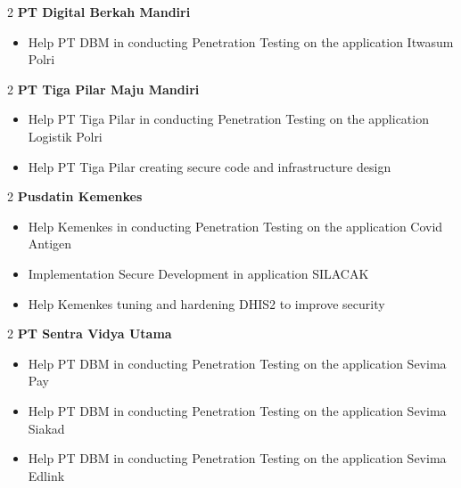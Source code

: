 \documentclass[10pt, letterpaper]{article}
\newenvironment{highlights}{
    \begin{itemize}[
        topsep=0.10 cm,
        parsep=0.10 cm,
        partopsep=0pt,
        itemsep=0pt,
        leftmargin=0 cm + 10pt
    ]
}{
    \end{itemize}
} %
\newenvironment{twocolentry}[2][]{
    \onecolentry
    \def\secondColumn{#2}
    \setcolumnwidth{\fill, 4.5 cm}
    \begin{paracol}{2}
}{
    \switchcolumn \raggedleft \secondColumn
    \end{paracol}
    \endonecolentry
} %
\begin{document}
	   \vspace{0.20 cm}
		\begin{samepage}
			\begin{twocolentry}{}{\textbf{PT Digital Berkah Mandiri}}
			\end{twocolentry}
			
			\begin{highlights}
				\item Help PT DBM in conducting Penetration Testing on the application Itwasum Polri
			\end{highlights}
		\end{samepage}
		
		\vspace{0.20 cm}
		\begin{samepage}
			\begin{twocolentry}{}{\textbf{PT Tiga Pilar Maju Mandiri}}
			\end{twocolentry}
			
			\begin{highlights}
				\item Help PT Tiga Pilar in conducting Penetration Testing on the application Logistik Polri
				\item Help PT Tiga Pilar creating secure code and infrastructure design
			\end{highlights}
		\end{samepage}
		
		\vspace{0.20 cm}
		\begin{samepage}
			\begin{twocolentry}{}{\textbf{Pusdatin Kemenkes}}
			\end{twocolentry}
			
			\begin{highlights}
				\item Help Kemenkes in conducting Penetration Testing on the application Covid Antigen
				\item Implementation Secure Development in application SILACAK
				\item Help Kemenkes tuning and hardening DHIS2 to improve security
			\end{highlights}
		\end{samepage}
		
	    \vspace{0.20 cm}
		\begin{samepage}
			\begin{twocolentry}{}{\textbf{PT Sentra Vidya Utama}}
			\end{twocolentry}
			
			\begin{highlights}
				\item Help PT DBM in conducting Penetration Testing on the application Sevima Pay
				\item Help PT DBM in conducting Penetration Testing on the application Sevima Siakad
				\item Help PT DBM in conducting Penetration Testing on the application Sevima Edlink
			\end{highlights}
		\end{samepage}
		
\end{document}
